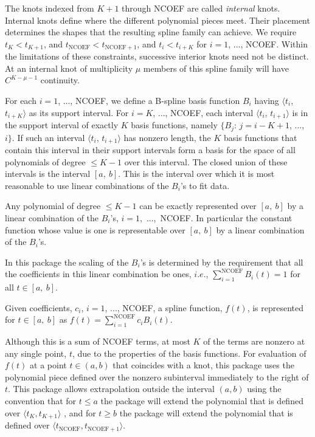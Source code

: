 \documentclass[twoside]{MATH77}
\begin{document}
The knots indexed from $K + 1$ through NCOEF are called {\em internal} knots.
Internal knots define where the different polynomial pieces meet. Their
placement determines the shapes that the resulting spline family can
achieve. We require $t_K < t_{K+1}$, and $t_{\text{NCOEF}} < t_{\text{NCOEF}%
+1}$, and $t_i < t_{i+K}$ for $i = 1$, ..., NCOEF. Within the limitations of
these constraints, successive interior knots need not be distinct. At
an internal knot of multiplicity $\mu $ members of this spline family will
have $C^{K-\mu -1}$ continuity.

For each $i = 1$, ..., NCOEF, we define a B-spline basis function $B_i$
having $\langle t_i$, $t_{i+K}\rangle $ as its support interval. For $i=K$,
..., NCOEF, each interval $\langle t_i$, $t_{i+1}\rangle $ is in the support
interval of exactly $K$ basis functions, namely $\{B_j$: $j = i-K+1$,
..., $i\}$. If such an interval $\langle t_i$, $t_{i+1}\rangle $ has nonzero
length, the $K$ basis functions that contain this interval in their support
intervals form a basis for the space of all polynomials of degree $\leq K - 1$
over this interval. The closed union of these intervals is the
interval $[a,~b]$. This is the interval over which it is most reasonable to
use linear combinations of the $B_i$'s to fit data.

Any polynomial of degree $\leq K-1$ can be exactly represented over $[a,~b]$
by a linear combination of the $B_i$'s, $i = 1$,\ ...,\ NCOEF. In
particular the constant function whose value is one is representable over $%
[a,~b]$ by a linear combination of the $B_i$'s.

In this package the scaling of the $B_i$'s is determined by the
requirement that all the coefficients in this linear combination be ones, $%
i.e.$, $\sum_{i=1}^{\text{NCOEF}} B_i(t)=1$ for all $t \in [a,~b].$

Given coefficients, $c_i$, $i = 1$, ..., NCOEF, a spline function, $f(t)$,
is represented for $t \in [a,~b]$ as $f(t) = \sum_{i=1}^{\text{NCOEF}}
c_i B_i(t).$

Although this is a sum of NCOEF terms, at most $K$ of the terms are nonzero
at any single point, $t$, due to the properties of the basis functions. For
evaluation of $f(t)$ at a point $t \in (a,b)$ that coincides with a knot,
this package uses the polynomial piece defined over the nonzero subinterval
immediately to the right of $t$. This package allows extrapolation outside
the interval $(a,b)$ using the convention that for $t \leq a$ the package
will extend the polynomial that is defined over $\langle t_K,t_{K+1}\rangle $%
, and for $t \geq b$ the package will extend the polynomial that is defined
over $\langle t_{\text{NCOEF}},t_{\text{NCOEF}+1}\rangle .$
\end{document}
